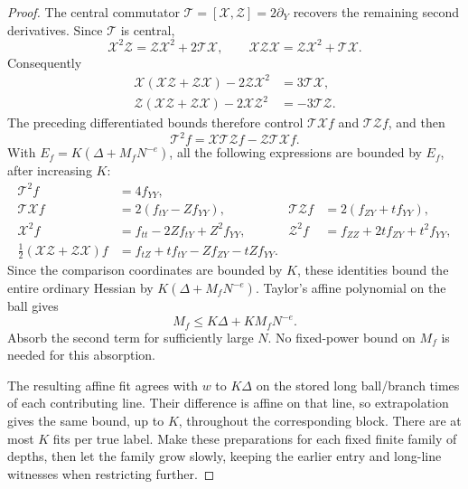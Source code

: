 \begin{proof}
The central commutator \(\mathcal T=[\mathcal X,\mathcal Z]
=2\partial_Y\) recovers the remaining second derivatives.  Since
\(\mathcal T\) is central,
\[
 \mathcal X^2\mathcal Z
   =\mathcal Z\mathcal X^2+2\mathcal T\mathcal X,
 \qquad
 \mathcal X\mathcal Z\mathcal X
   =\mathcal Z\mathcal X^2+\mathcal T\mathcal X.
\]
Consequently
\begin{align*}
 \mathcal X(\mathcal X\mathcal Z+\mathcal Z\mathcal X)
       -2\mathcal Z\mathcal X^2&=3\mathcal T\mathcal X,\\
 \mathcal Z(\mathcal X\mathcal Z+\mathcal Z\mathcal X)
       -2\mathcal X\mathcal Z^2&=-3\mathcal T\mathcal Z.
\end{align*}
The preceding differentiated bounds therefore control
\(\mathcal T\mathcal Xf\) and \(\mathcal T\mathcal Zf\), and then
\[
 \mathcal T^2f
   =\mathcal X\mathcal T\mathcal Zf-
      \mathcal Z\mathcal T\mathcal Xf.
\]
With \(E_f=K(\Delta+M_fN^{-e})\), all the following expressions are
bounded by \(E_f\), after increasing \(K\):
\begin{align*}
 \mathcal T^2f&=4f_{YY},\\
 \mathcal T\mathcal Xf&=2(f_{tY}-Zf_{YY}),&
 \mathcal T\mathcal Zf&=2(f_{ZY}+tf_{YY}),\\
 \mathcal X^2f&=f_{tt}-2Zf_{tY}+Z^2f_{YY},&
 \mathcal Z^2f&=f_{ZZ}+2tf_{ZY}+t^2f_{YY},\\
 \tfrac12(\mathcal X\mathcal Z+\mathcal Z\mathcal X)f
   &=f_{tZ}+tf_{tY}-Zf_{ZY}-tZf_{YY}.
\end{align*}
Since the comparison coordinates are bounded by \(K\), these
identities bound the entire ordinary Hessian by
\(K(\Delta+M_fN^{-e})\).  Taylor's affine polynomial on the ball
gives
\[
 M_f\le K\Delta+KM_fN^{-e}.
\]
Absorb the second term for sufficiently large \(N\).  No fixed-power
bound on \(M_f\) is needed for this absorption.

The resulting affine fit agrees with \(w\) to \(K\Delta\) on the
stored long ball/branch times of each contributing line.
Their difference is affine on that line, so extrapolation gives
the same bound, up to \(K\), throughout the corresponding block.
There are at most \(K\) fits per true label.  Make these
preparations for each fixed finite family of depths, then let the
family grow slowly, keeping the earlier entry and long-line
witnesses when restricting further.
\end{proof}

